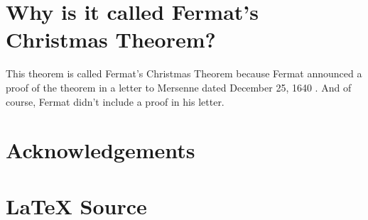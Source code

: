 \documentclass{article}
\theoremstyle{definition}
\begin{document}
\section{Why is it called Fermat's Christmas Theorem?}
This theorem is called Fermat's Christmas Theorem 
because Fermat announced a proof of the theorem in a letter 
to Mersenne dated December 25, 1640 \cite{wiki:christmas_theorem}. And of course, Fermat 
didn't include a proof in his letter.
%
%
%
\section*{Acknowledgements}
\label{sec:acknowledgements}
%
%
\section*{\LaTeX \hspace{0.025 mm} Source}
\newpage				%
%
%
%


%
%
%
%
%
\end{document}

